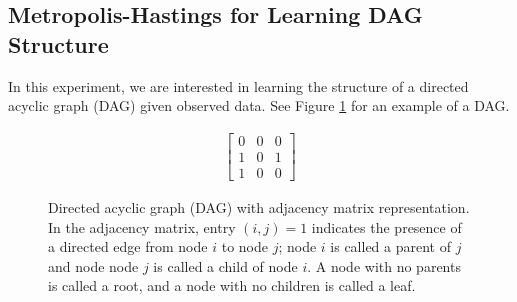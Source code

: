 \documentclass[a4paper,11pt]{article}
\begin{document}
\subsection{Metropolis-Hastings for Learning DAG Structure}
In this experiment, we are interested in learning the structure of a directed acyclic graph (DAG) given observed data. See Figure \ref{fig:ex3_dag} for an example of a DAG.

\begin{figure}[H]
    \centering
    \begin{minipage}[b]{0.25\textwidth}
        \centering
        \usetikzlibrary{shapes.geometric}
    \end{minipage}
     \begin{minipage}[b]{0.25\textwidth}
    \begin{align*}
        \begin{bmatrix}
            0 & 0 & 0 \\
            1 & 0 & 1 \\
            1 & 0 & 0 
        \end{bmatrix}
    \end{align*}
    \vspace{2ex}
    \end{minipage}
    \caption{Directed acyclic graph (DAG) with adjacency matrix representation. In the adjacency matrix, entry $(i,j)=1$ indicates the presence of a directed edge from node $i$ to node $j$; node $i$ is called a parent of $j$ and node node $j$ is called a child of node $i$. A node with no parents is called a root, and a node with no children is called a leaf.}
    \label{fig:ex3_dag}
\end{figure}
\end{document}
